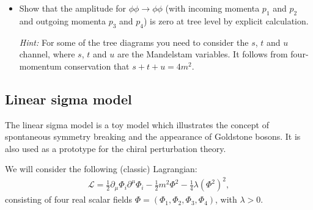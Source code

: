 \documentclass[11pt]{latex/exercise}
\begin{document}
\begin{itemize}
\begin{align}
\begin{tikzpicture}
                     \draw (225:1)node[below]{$p_2$}--(0,0)node[midway, rotate=-45]{\myarrow};
                     \draw (0:1)node[above]{$p_3$}--(0,0)node[midway, rotate=90]{\myarrow};
                     \vertex{0,0}{3};
                     \node at(2.5,0){$\displaystyle=-\frac{6im^2}{\Lambda}
                         $};
                 \end{tikzpicture}
              \\
               & \begin{tikzpicture}
                     \draw (135:1)node[above]{$p_1$}--(0,0)node[midway, rotate=-135]{\myarrow};
                     \draw (225:1)node[below]{$p_2$}--(0,0)node[midway, rotate=-45]{\myarrow};
                     \draw (0:1)node[above]{$p_3$}--(0,0)node[midway, rotate=90]{\myarrow};
                     \vertex{0,0}{4};
                     \node at(4.3,0){$\displaystyle=-\frac{4i}{\Lambda}
                             (p_1\cdot p_2+p_1\cdot p_3+p_2\cdot p_3)
                         $};
                 \end{tikzpicture}
          \end{align}
    \item[(c)] Show that the amplitude for $\phi\phi\rightarrow\phi\phi$ (with incoming momenta $p_1$ and $p_2$ and outgoing momenta $p_3$ and $p_4$) is zero at tree level by explicit calculation.

          \emph{Hint:} For some of the tree diagrams you need to consider the $s$, $t$ and $u$ channel, where $s$, $t$ and $u$ are the Mandelstam variables. It follows from four-momentum conservation that $s+t+u=4m^2$.
\end{itemize}



\subsection{Linear sigma model}
\noindent
The linear sigma model is a toy model which illustrates the concept of spontaneous symmetry breaking
and the appearance of Goldstone bosons. It is also used as a prototype for the chiral perturbation theory.

We will consider the following (classic) Lagrangian:
\begin{eqnarray}
    \mathcal{L} =
    \frac12 \partial_{\mu} \Phi_i \partial^{\mu} \Phi_i
    -\frac{1}{2} m^2 \Phi^2
    -\frac{1}{4}\lambda(\Phi^2)^2,
    \label{eq:L}
\end{eqnarray}
consisting of four real scalar fields $\Phi=(\Phi_1,\Phi_2,\Phi_3,\Phi_4)$, with $\lambda>0$.
\end{document}
